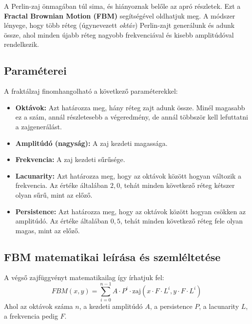 \documentclass[12pt]{article}
\begin{document}
A Perlin-zaj önmagában túl sima, és hiányoznak belőle az apró részletek. Ezt a
\textbf{Fractal Brownian Motion (FBM)} segítségével oldhatjuk meg. A módszer
lényege, hogy több réteg (úgynevezett \textit{oktáv}) Perlin-zajt generálunk és
adunk össze, ahol minden újabb réteg nagyobb frekvenciával és kisebb
amplitúdóval rendelkezik.

\subsection{Paraméterei}
A fraktálzaj finomhangolható a következő paraméterekkel:

\begin{itemize}[noitemsep]
    \item \textbf{Oktávok:} Azt határozza meg, hány réteg zajt adunk össze. Minél magasabb ez a szám, annál részletesebb a végeredmény, de annál többször kell lefuttatni a zajgenerálást.
    \item \textbf{Amplitúdó (nagyság):} A zaj kezdeti magassága.
    \item \textbf{Frekvencia:} A zaj kezdeti sűrűsége.
    \item \textbf{Lacunarity:} Azt határozza meg, hogy az oktávok között hogyan változik a frekvencia. Az értéke általában $2,0$, tehát minden következő réteg kétszer olyan sűrű, mint az előző.
    \item \textbf{Persistence:} Azt határozza meg, hogy az oktávok között hogyan csökken az amplitúdó. Az értéke általában $0,5$, tehát minden következő réteg fele olyan magas, mint az előző.
\end{itemize}

\subsection{FBM matematikai leírása és szemléltetése}
A végső zajfüggvényt matematikailag így írhatjuk fel:
\[
    FBM(x, y) = \sum_{i=0}^{n-1} A \cdot P^i \cdot \text{zaj}(x \cdot F \cdot L^i, y \cdot F \cdot L^i)
\]
Ahol az oktávok száma \textbf{$n$}, a kezdeti amplitúdó \textbf{$A$}, a
persistence \textbf{$P$}, a lacunarity \textbf{$L$}, a frekvencia pedig
\textbf{$F$}.
\end{document}
